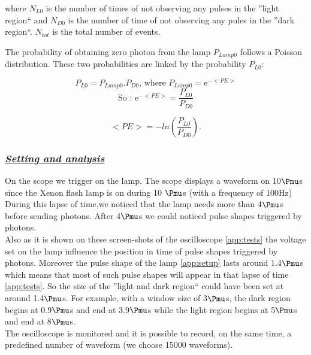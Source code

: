\documentclass[a4paper, 11pt]{report}%
\newcommand{\xfl}{Xenon flash lamp }
\begin{document}
  where \(N_{L0}\) is the number of times of not observing any pulses in the ''light region`` and \(N_{D0}\) is the number of time of not observing 
  any pules in the ''dark region``. 
  \(N_{tot}\) is the total number of events. 
  
  The probability of obtaining zero photon from the lamp \(P_{Lamp0}\)
  follows a Poisson distribution. These two probabilities are linked by the probability \(P_{L0}\): 
  
  \begin{equation}\label{eq:Poisson_law}
    P_{L0} = P_{Lamp0}.P_{D0} \textrm{, where } P_{Lamp0} = \mathrm{e}^{-<PE>}
  \end{equation}
  \begin{equation}
    \textrm{So : } \mathrm{e}^{-<PE>} =\frac{P_{L0}}{P_{D0}}
  \end{equation}
  
  \begin{equation}
    <PE> =  -ln(\frac{P_{L0}}{P_{D0}}).
  \end{equation}
  
  \subsubsection{\textit{\underline{Setting and analysis}}}
  
  On the scope we trigger on the lamp. The scope displays a waveform on 10$\Pmu$s since the \xfl is on during 10 $\Pmu$s (with a frequency of 100Hz)\\
  During this lapse of time,we noticed that the lamp needs more than 4$\Pmu$s before sending photons. After 4$\Pmu$s we could noticed 
  pulse shapes triggered by photons.\\
  Also as it is shown on these screen-shots of the oscilloscope \ref{app:tests} the voltage set on the lamp influence the position 
  in time of pulse shapes triggered by photons. Moreover the pulse shape of the lamp \ref{app:setup} lasts around 1.4$\Pmu$s which means that 
  most of such pulse shapes will appear in that lapse of time \ref{app:tests}. So the size of the ''light and dark region`` could have
  been set at around 1.4$\Pmu$s. 
  For example, with a window size of 3$\Pmu$s, the dark region begins at 0.9$\Pmu$s and end at 3.9$\Pmu$s while the light region 
  begins at 5$\Pmu$s and end at 8$\Pmu$s.
  \\
  
  The oscilloscope is monitored and it is possible to record, on the same time, a predefined number of waveform 
  (we choose 15000 waveforms). 
  \\
  
\end{document}
